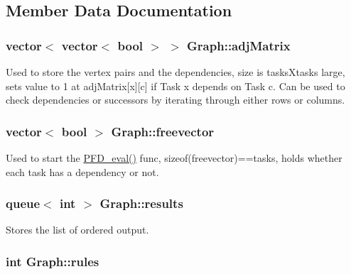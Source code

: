 \subsection{Member Data Documentation}
\hypertarget{structGraph_a25439b7cad72199504e1fdd1fbe70130}{
\subsubsection[{adj\+Matrix}]{\setlength{\rightskip}{0pt plus 5cm}vector$<$ vector$<$ bool $>$ $>$ Graph\+::adj\+Matrix}}\label{structGraph_a25439b7cad72199504e1fdd1fbe70130}


Used to store the vertex pairs and the dependencies, size is tasks\+Xtasks large, sets value to 1 at adj\+Matrix\mbox{[}x\mbox{]}\mbox{[}c\mbox{]} if Task x depends on Task c. Can be used to check dependencies or successors by iterating through either rows or columns. 

\hypertarget{structGraph_a8d3788ddc13794edb1426c6c1960b4c6}{
\subsubsection[{freevector}]{\setlength{\rightskip}{0pt plus 5cm}vector$<$ bool $>$ Graph\+::freevector}}\label{structGraph_a8d3788ddc13794edb1426c6c1960b4c6}


Used to start the \hyperlink{structGraph_ac6a0946ed59ad938626736c9c5e084e6}{P\+F\+D\+\_\+eval()} func, sizeof(freevector)==tasks, holds whether each task has a dependency or not. 

\hypertarget{structGraph_a97da3b3f97afbd334c70b354a3be4551}{
\subsubsection[{results}]{\setlength{\rightskip}{0pt plus 5cm}queue$<$ int $>$ Graph\+::results}}\label{structGraph_a97da3b3f97afbd334c70b354a3be4551}


Stores the list of ordered output. 

\hypertarget{structGraph_a7d540d84c08510deb0f2b0692ed5afcd}{
\subsubsection[{rules}]{\setlength{\rightskip}{0pt plus 5cm}int Graph\+::rules}}\label{structGraph_a7d540d84c08510deb0f2b0692ed5afcd}


